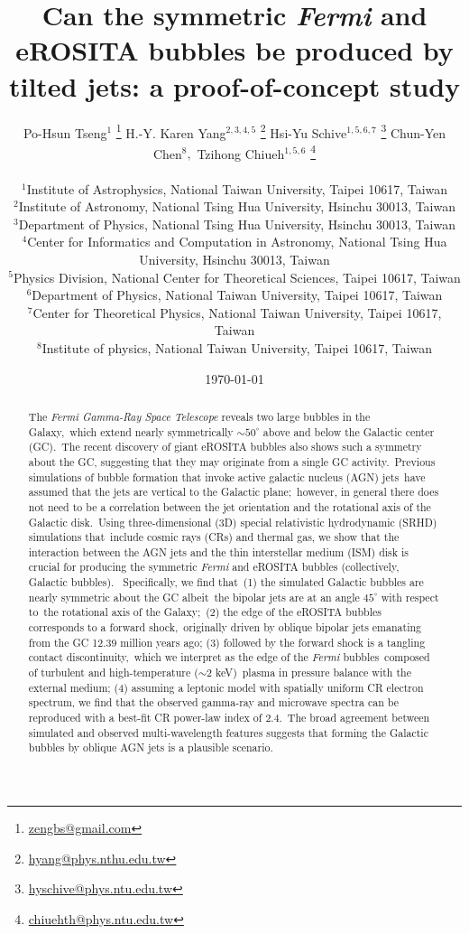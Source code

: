 \documentclass[fleqn,usenatbib,useAMS]{mnras}
\title[]{Can the symmetric \textit{Fermi} and eROSITA bubbles be produced by tilted jets: a proof-of-concept study}
\author[P. H. Tseng et al.]{\large
Po-Hsun Tseng$^{1}$%
\thanks{\href{mailto:zengbs@gmail.com}{zengbs@gmail.com}}%
\orcidlink{https://orcid.org/0000-0002-1868-0660}%
\quad H.-Y. Karen Yang$^{2,3,4,5}$%
\thanks{\href{mailto:hyang@phys.nthu.edu.tw}{hyang@phys.nthu.edu.tw}}%
\orcidlink{https://orcid.org/0000-0003-3269-4660}%
\quad Hsi-Yu Schive$^{1,5,6,7}$%
\thanks{\href{mailto:hyschive@phys.ntu.edu.tw}{hyschive@phys.ntu.edu.tw}}%
\orcidlink{https://orcid.org/0000-0002-1249-279X}%
\quad Chun-Yen Chen$^{8}, $
\quad Tzihong Chiueh$^{1,5,6}$%
\thanks{\href{mailto:chiuehth@phys.ntu.edu.tw}{chiuehth@phys.ntu.edu.tw}}%
\orcidlink{https://orcid.org/0000-0003-2654-8763}%
\\\\
$^{1}$Institute of Astrophysics, National Taiwan University, Taipei 10617, Taiwan\\
$^{2}$Institute of Astronomy, National Tsing Hua University, Hsinchu 30013, Taiwan\\
$^{3}$Department of Physics, National Tsing Hua University, Hsinchu 30013, Taiwan\\
$^{4}$Center for Informatics and Computation in Astronomy, National Tsing Hua University, Hsinchu 30013, Taiwan\\
$^{5}$Physics Division, National Center for Theoretical Sciences, Taipei 10617, Taiwan\\
$^{6}$Department of Physics, National Taiwan University, Taipei 10617, Taiwan\\
$^{7}$Center for Theoretical Physics, National Taiwan University, Taipei 10617, Taiwan\\
$^{8}$Institute of physics, National Taiwan University, Taipei 10617, Taiwan\\
}
\date{\today}
\begin{document}
\label{firstpage}
\pagerange{\pageref{firstpage}--\pageref{lastpage}}
\maketitle

\begin{abstract}
The \textit{Fermi Gamma-Ray Space Telescope} reveals two large bubbles in the Galaxy,\
which extend nearly symmetrically $\sim50^{\circ}$ above and below the Galactic center (GC).\
The recent discovery of giant eROSITA bubbles also shows such a symmetry about the GC, suggesting that they may originate from a single GC activity.\
Previous simulations of bubble formation that invoke active galactic nucleus (AGN) jets\
have assumed that the jets are vertical to the Galactic plane;\
however, in general there does not need to be a correlation between the jet orientation and the rotational axis of the Galactic disk.\
Using three-dimensional (3D) special relativistic hydrodynamic (SRHD) simulations that\
include cosmic rays (CRs) and thermal gas, we show that the interaction between the AGN jets and the thin interstellar medium (ISM) disk is crucial for producing the symmetric \textit{Fermi} and eROSITA bubbles (collectively, Galactic bubbles).\
Specifically, we find that\
(1) the simulated Galactic bubbles are nearly symmetric about the GC albeit\
the bipolar jets are at an angle $45^{\circ}$ with respect to\
the rotational axis of the Galaxy;\
(2) the edge of the eROSITA bubbles corresponds to a forward shock,\
originally driven by oblique bipolar jets emanating from the GC 12.39 million years ago; %
(3) followed by the forward shock is a tangling contact discontinuity,\
which we interpret as the edge of the \textit{Fermi} bubbles\
composed of turbulent and high-temperature ($\sim2$ keV)\
plasma in pressure balance with the external medium;
(4) assuming a leptonic model with spatially uniform CR electron spectrum, we find that the observed gamma-ray and microwave spectra can be reproduced with a best-fit CR power-law index of 2.4.\
The broad agreement between simulated and observed multi-wavelength features suggests that forming the Galactic bubbles by oblique AGN jets is a plausible scenario.
\end{abstract}
\end{document}
